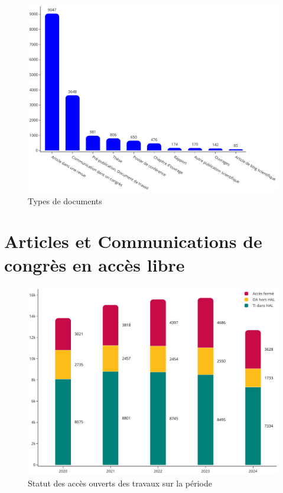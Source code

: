 \documentclass[french, 11pt]{dibiso/biso}
\begin{document}
\begin{figure}[!h]
  \includegraphics[width=\textwidth]{figures/works_type.pdf}
  \centering
  \caption{Types de documents}
  \label{fig_doc_type}
\end{figure}







\pagebreak

\section{Articles et Communications de congrès en accès libre} %

\begin{figure}[!h]
  \includegraphics[width=\textwidth]{figures/open_access_works.pdf}
  \caption{Statut des accès ouverts des travaux sur la période {\oaworksperiod}}
  \label{fig_open_access_works}
\end{figure}
\end{document}
